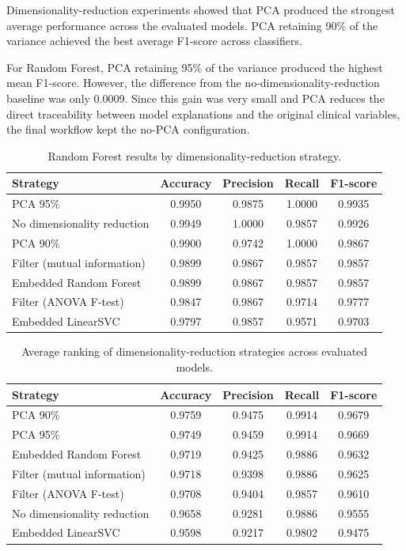 Dimensionality-reduction experiments showed that PCA produced the strongest
average performance across the evaluated models. PCA retaining 90\% of the
variance achieved the best average F1-score across classifiers.

For Random Forest, PCA retaining 95\% of the variance produced the highest mean
F1-score. However, the difference from the no-dimensionality-reduction baseline
was only 0.0009. Since this gain was very small and
PCA reduces the direct traceability between model explanations and the original
clinical variables, the final workflow kept the no-PCA configuration.

\begin{table}[!htbp]
\centering
\caption{Random Forest results by dimensionality-reduction strategy.}
\label{tab:rf_dimensionality_reduction}
\begin{tabular}{lcccc}
\hline
Strategy & Accuracy & Precision & Recall & F1-score \\
\hline
PCA 95\% & 0.9950 & 0.9875 & 1.0000 & 0.9935 \\
No dimensionality reduction & 0.9949 & 1.0000 & 0.9857 & 0.9926 \\
PCA 90\% & 0.9900 & 0.9742 & 1.0000 & 0.9867 \\
Filter (mutual information) & 0.9899 & 0.9867 & 0.9857 & 0.9857 \\
Embedded Random Forest & 0.9899 & 0.9867 & 0.9857 & 0.9857 \\
Filter (ANOVA F-test) & 0.9847 & 0.9867 & 0.9714 & 0.9777 \\
Embedded LinearSVC & 0.9797 & 0.9857 & 0.9571 & 0.9703 \\
\hline
\end{tabular}
\end{table}

\begin{table}[!htbp]
\centering
\caption{Average ranking of dimensionality-reduction strategies across evaluated models.}
\label{tab:dr_average_ranking}
\begin{tabular}{lcccc}
\hline
Strategy & Accuracy & Precision & Recall & F1-score \\
\hline
PCA 90\% & 0.9759 & 0.9475 & 0.9914 & 0.9679 \\
PCA 95\% & 0.9749 & 0.9459 & 0.9914 & 0.9669 \\
Embedded Random Forest & 0.9719 & 0.9425 & 0.9886 & 0.9632 \\
Filter (mutual information) & 0.9718 & 0.9398 & 0.9886 & 0.9625 \\
Filter (ANOVA F-test) & 0.9708 & 0.9404 & 0.9857 & 0.9610 \\
No dimensionality reduction & 0.9658 & 0.9281 & 0.9886 & 0.9555 \\
Embedded LinearSVC & 0.9598 & 0.9217 & 0.9802 & 0.9475 \\
\hline
\end{tabular}
\end{table}

